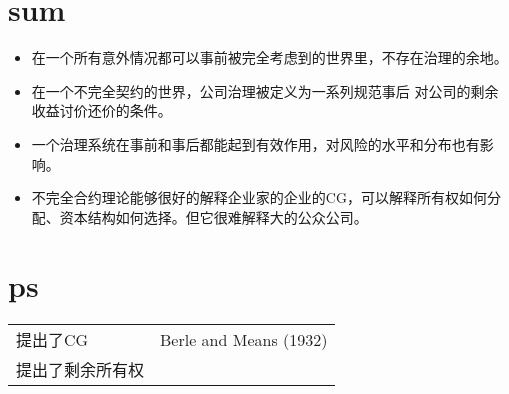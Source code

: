 \documentclass[a4paper]{article}
\begin{document}
\section{sum}%
\begin{itemize}
	\item 在一个所有意外情况都可以事前被完全考虑到的世界里，不存在治理的余地。
	\item 在一个不完全契约的世界，公司治理被定义为一系列规范事后
	对公司的剩余收益讨价还价的条件。
	\item 一个治理系统在事前和事后都能起到有效作用，对风险的水平和分布也有影响。
	\item 不完全合约理论能够很好的解释企业家的企业的CG，可以解释所有权如何分配、资本结构如何选择。但它很难解释大的公众公司。
\end{itemize}


\section*{ps}
\begin{tabular}{ll}
	提出了CG		& Berle and Means (1932) \\
	提出了剩余所有权& \citet{grossman1986}\\
	
\end{tabular}
\end{document}
